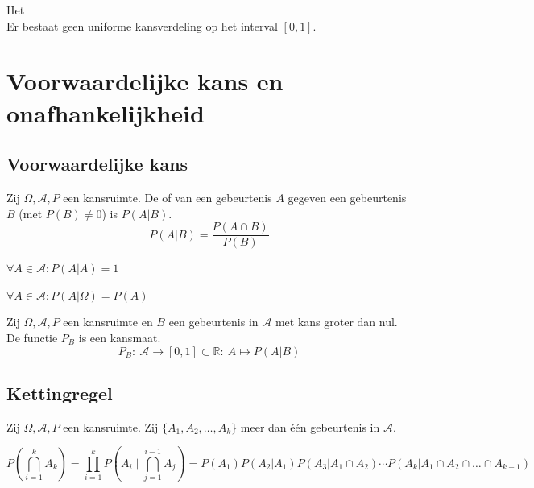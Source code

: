 \documentclass[main.tex]{subfiles}
\begin{document}
\begin{st}
  Het \\
  Er bestaat geen uniforme kansverdeling op het interval $[0,1]$.
\zb
\end{st}

\section{Voorwaardelijke kans en onafhankelijkheid}
\label{sec:voorwaardelijke-kans-en-onafhankelijkheid}

\subsection{Voorwaardelijke kans}
\label{sec:voorwaardelijke-kans}

\begin{de}
  Zij $\Omega,\mathcal{A},P$ een kansruimte.
  De  of  van een gebeurtenis $A$ gegeven een gebeurtenis $B$ (met $P(B) \neq 0$) is $P(A|B)$.
  \[ P(A|B) = \frac{P(A\cap B)}{P(B)} \]
\end{de}

\begin{ei}
  $\forall A \in \mathcal{A}: P(A|A) = 1$
\end{ei}

\begin{ei}
  $\forall A \in \mathcal{A}: P(A|\Omega) = P(A)$
\end{ei}

\begin{st}
  Zij $\Omega,\mathcal{A},P$ een kansruimte en $B$ een gebeurtenis in $\mathcal{A}$ met kans groter dan nul.
  De functie $P_{B}$ is een kansmaat.
  \[ P_{B}:\ \mathcal{A} \rightarrow [0,1] \subset \mathbb{R}:\ A \mapsto P(A|B) \]
\end{st}

\subsection{Kettingregel}
\label{sec:kettingregel}

\begin{st}
  Zij $\Omega,\mathcal{A},P$ een kansruimte.
  Zij $\{ A_{1}, A_{2}, \dotsc, A_{k}\}$ meer dan \'e\'en gebeurtenis in $\mathcal{A}$.

  \[
  P\left(\bigcap_{i=1}^{k}A_{k}\right)
  = \prod_{i=1}^{k}P\left(A_{i}\mid\bigcap_{j=1}^{i-1}A_{j}\right)
  = P(A_{1})P(A_{2}|A_{1})P(A_{3}|A_{1}\cap A_{2}) \dotsb P(A_{k}|A_{1}\cap A_{2}\cap \dotsc \cap A_{k-1})
  \]
\end{st}
\end{document}
